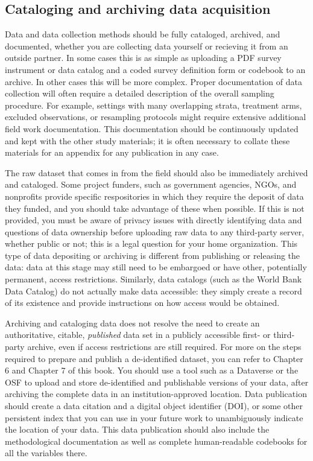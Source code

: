 \subsection{Cataloging and archiving data acquisition}

Data and data collection methods should be fully cataloged, archived, and documented,
whether you are collecting data yourself or recieving it from an outside partner.
In some cases this is as simple as uploading a PDF survey instrument or data catalog
and a coded survey definition form or codebook to an archive.
In other cases this will be more complex.
Proper documentation of data collection will often require
a detailed description of the overall sampling procedure.
For example, settings with many overlapping strata,
treatment arms, excluded observations, or resampling protocols
might require extensive additional field work documentation.
This documentation should be continuously updated
and kept with the other study materials;
it is often necessary to collate these materials
for an appendix for any publication in any case.

The raw dataset that comes in from the field should also be immediately archived and cataloged.
Some project funders, such as government agencies, NGOs, and nonprofits
provide specific respositories in which they require the deposit of data they funded,
and you should take advantage of these when possible.
If this is not provided, you must be aware of privacy issues
with directly identifying data and questions of data ownership
before uploading raw data to any third-party server, whether public or not;
this is a legal question for your home organization.
This type of data depositing or archiving
is different from publishing or releasing the data:
data at this stage may still need to be embargoed
or have other, potentially permanent, access restrictions.
Similarly, data catalogs (such as the World Bank Data Catalog)
do not actually make data accessible: they simply create a record of its existence
and provide instructions on how access would be obtained.

Archiving and cataloging data does not resolve
the need to create an authoritative, citable, \textit{published} data set
in a publicly accessible first- or third-party archive,
even if access restrictions are still required.
For more on the steps required to prepare and publish a de-identified dataset,
you can refer to Chapter 6 and Chapter 7 of this book.
You should use a tool such as a Dataverse or the OSF
to upload and store de-identified and publishable versions of your data,
after archiving the complete data in an institution-approved location.
Data publication should create a data citation and a digital object identifier (DOI),
or some other persistent index that you can use in your future work
to unambiguously indicate the location of your data.
This data publication should also include the methodological documentation
as well as complete human-readable codebooks for all the variables there.

